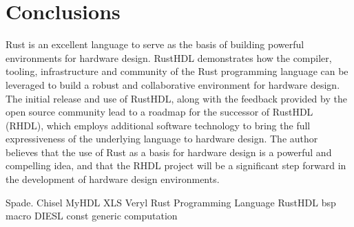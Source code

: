 \documentclass[conference]{IEEEtran}
\begin{document}
\section{Conclusions}\label{sec:conclusions}

Rust is an excellent language to serve as the basis of building powerful environments for 
hardware design.  RustHDL demonstrates how the compiler, tooling, infrastructure and 
community of the Rust programming language can be leveraged to build a robust and 
collaborative environment for hardware design.  The initial release and use of RustHDL,
along with the feedback provided by the open source community lead to a roadmap for 
the successor of RustHDL (RHDL), which employs additional software technology to bring
the full expressiveness of the underlying language to hardware design.  The author believes
that the use of Rust as a basis for hardware design is a powerful and compelling idea, and
that the RHDL project will be a significant step forward in the development of hardware
design environments.

\begin{thebibliography}{00}
 Spade.
 Chisel
 MyHDL
 XLS
 Veryl
 Rust Programming Language
 RustHDL
 bsp
 macro
 DIESL
 const generic computation
\end{thebibliography}
\vspace{12pt}
\end{document}
